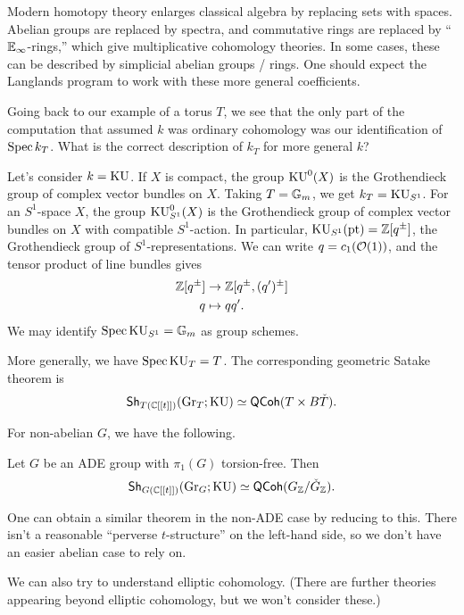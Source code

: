 \documentclass{article}
\begin{document}
Modern homotopy theory enlarges classical algebra by replacing sets with spaces.
Abelian groups are replaced by spectra, and commutative rings are replaced by ``$\mathbb{E}_\infty$-rings,'' which give multiplicative cohomology theories.
In some cases, these can be described by simplicial abelian groups / rings.
One should expect the Langlands program to work with these more general coefficients.

\begin{ex}
	Going back to our example of a torus $T$, we see that the only part of the computation that assumed $k$ was ordinary cohomology was our identification of $\operatorname{Spec} k_T$.
	What is the correct description of $k_T$ for more general $k$?

	Let's consider $k = \mathrm{KU}$.
	If $X$ is compact, the group $\mathrm{KU}^0(X)$ is the Grothendieck group of complex vector bundles on $X$.
	Taking $T = \mathbb{G}_m$, we get $k_T = \mathrm{KU}_{S^1}$.
	For an $S^1$-space $X$, the group $\mathrm{KU}_{S^1}^0(X)$ is the Grothendieck group of complex vector bundles on $X$ with compatible $S^1$-action.
	In particular, $\mathrm{KU}_{S^1}(\operatorname{pt}) = \mathbb{Z}[q^\pm]$, the Grothendieck group of $S^1$-representations.
	We can write $q = c_1(\mathcal{O}(1))$, and the tensor product of line bundles gives 
	\begin{align*}
		\mathbb{Z}[q^\pm] &\to \mathbb{Z}[q^\pm, (q')^\pm] \\
		q &\mapsto q q'.
	\end{align*}
	We may identify $\operatorname{Spec} \mathrm{KU}_{S^1} = \mathbb{G}_m$ as group schemes.
	
	More generally, we have $\operatorname{Spec} \mathrm{KU}_T = T$.
	The corresponding geometric Satake theorem is
	\[
		\mathsf{Sh}_{T(\mathbb{C}[[t]])}(\operatorname{Gr}_T; \mathrm{KU}) \simeq \mathsf{QCoh}(T \times B\check{T}).
	\]
\end{ex}

For non-abelian $G$, we have the following.

\begin{thm}[Devalapurkar]
	Let $G$ be an ADE group with $\pi_1(G)$ torsion-free.
	Then
	\[
		\mathsf{Sh}_{G(\mathbb{C}[[t]])}(\operatorname{Gr}_G; \mathrm{KU}) \simeq \mathsf{QCoh}(G_{\mathbb{Z}} / \check{G}_{\mathbb{Z}}).
	\]
\end{thm}

One can obtain a similar theorem in the non-ADE case by reducing to this.
There isn't a reasonable ``perverse $t$-structure'' on the left-hand side, so we don't have an easier abelian case to rely on.

We can also try to understand elliptic cohomology.
(There are further theories appearing beyond elliptic cohomology, but we won't consider these.)
\end{document}
